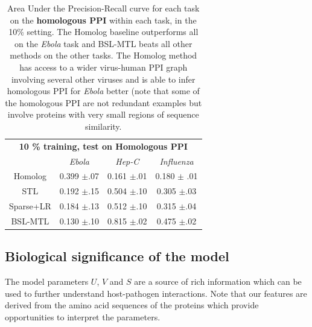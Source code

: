 \documentclass{bioinfo}
\begin{document}
\begin{table}\caption{Area Under the Precision-Recall curve for each task on the \textbf{homologous PPI} within each task, in the 10\% setting. The Homolog baseline outperforms all on the \textit{Ebola} task and BSL-MTL beats all other methods on the other tasks. The Homolog method has access to a wider virus-human PPI graph involving several other viruses and is able to infer homologous PPI for \textit{Ebola} better (note that some of the homologous PPI are not redundant examples but involve proteins with very small regions of sequence similarity.}
\label{homresultsTable}
\begin{small}
\begin{center}
\def\arraystretch{1.2}
\begin{tabular}{c|ccc}
\toprule
\multicolumn{4}{c}{\textbf{10 \% training, test on Homologous PPI }} \\
& \textit{Ebola} & \textit{Hep-C} & \textit{Influenza} \\ \midrule
Homolog & 0.399 $\pm$.07 & 0.161 $\pm$.01 & 0.180 $\pm$ .01 \\
STL   & 0.192 $\pm$.15 & 0.504 $\pm$.10 & 0.305 $\pm$.03 \\
Sparse+LR & 0.184 $\pm$.13 & 0.512 $\pm$.10 & 0.315 $\pm$.04 \\ 
BSL-MTL & 0.130 $\pm$.10 & 0.815 $\pm$.02 & 0.475 $\pm$.02 \\ \bottomrule
\end{tabular}
\end{center}
\end{small}
\end{table}


\subsection{Biological significance of the model}
\label{bioanalysis}
The model parameters $U$, $V$ and $S$ are a source of rich information which can be used to further understand host-pathogen
interactions. Note that our features are derived from the amino acid sequences of the proteins which provide
opportunities to interpret the parameters.
\end{document}
